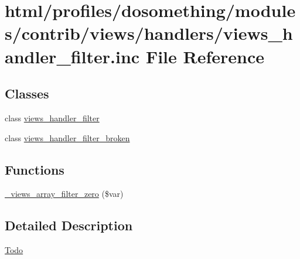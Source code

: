 \hypertarget{views__handler__filter_8inc}{
\section{html/profiles/dosomething/modules/contrib/views/handlers/views\_\-handler\_\-filter.inc File Reference}
\label{views__handler__filter_8inc}
}
\subsection*{Classes}
\begin{DoxyCompactItemize}
\item 
class \hyperlink{classviews__handler__filter}{views\_\-handler\_\-filter}
\item 
class \hyperlink{classviews__handler__filter__broken}{views\_\-handler\_\-filter\_\-broken}
\end{DoxyCompactItemize}
\subsection*{Functions}
\begin{DoxyCompactItemize}
\item 
\hyperlink{group__views__filter__handlers_ga4877cb7e6a7e3cda21438608fa979cbb}{\_\-views\_\-array\_\-filter\_\-zero} (\$var)
\end{DoxyCompactItemize}


\subsection{Detailed Description}
\begin{Desc}
\item[\hyperlink{todo__todo000046}{Todo}]\end{Desc}
